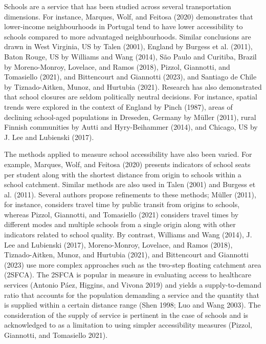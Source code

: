 \documentclass[
default
]{sn-jnl}
\begin{document}
Schools are a service that has been studied across several
transportation dimensions. For instance, Marques, Wolf, and Feitosa
(2020) demonstrates that lower-income neighbourhoods in Portugal tend to
have lower accessibility to schools compared to more advantaged
neighbourhoods. Similar conclusions are drawn in West Virginia, US by
Talen (2001), England by Burgess et al. (2011), Baton Rouge, US by
Williams and Wang (2014), São Paulo and Curitiba, Brazil by
Moreno-Monroy, Lovelace, and Ramos (2018), Pizzol, Giannotti, and
Tomasiello (2021), and Bittencourt and Giannotti (2023), and Santiago de
Chile by Tiznado-Aitken, Munoz, and Hurtubia (2021). Research has also
demonstrated that school closures are seldom politically neutral
decisions. For instance, spatial trends were explored in the context of
England by Pinch (1987), areas of declining school-aged populations in
Dreseden, Germany by Müller (2011), rural Finnish communities by Autti
and Hyry-Beihammer (2014), and Chicago, US by J. Lee and Lubienski
(2017).

The methods applied to measure school accessibility have also been
varied. For example, Marques, Wolf, and Feitosa (2020) presents
indicators of school seats per student along with the shortest distance
from origin to schools within a school catchment. Similar methods are
also used in Talen (2001) and Burgess et al. (2011). Several authors
propose refinements to these methods; Müller (2011), for instance,
considers travel time by public transit from origins to schools, whereas
Pizzol, Giannotti, and Tomasiello (2021) considers travel times by
different modes and multiple schools from a single origin along with
other indicators related to school quality. By contrast, Williams and
Wang (2014), J. Lee and Lubienski (2017), Moreno-Monroy, Lovelace, and
Ramos (2018), Tiznado-Aitken, Munoz, and Hurtubia (2021), and
Bittencourt and Giannotti (2023) use more complex approaches such as the
two-step floating catchment area (2SFCA). The 2SFCA is popular in
measure in evaluating access to healthcare services (Antonio Páez,
Higgins, and Vivona 2019) and yields a supply-to-demand ratio that
accounts for the population demanding a service and the quantity that is
supplied within a certain distance range (Shen 1998; Luo and Wang 2003).
The consideration of the supply of service is pertinent in the case of
schools and is acknowledged to as a limitation to using simpler
accessibility measures (Pizzol, Giannotti, and Tomasiello 2021).
\end{document}
